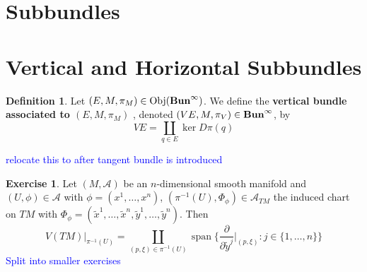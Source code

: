 \documentclass{book}
\theoremstyle{definition}
\newtheorem{defn}[definition]{Definition}
\newtheorem{ex}[definition]{Exercise}
\newcommand{\MA}{\mathcal{A}}
\DeclareMathOperator{\spn}{span}
\DeclareMathOperator{\Obj}{Obj}
\DeclareMathOperator*{\Buninf}{\text{\tbf{Bun}}^{\infty}}
\DeclareMathOperator*{\0}{\mbf{0}}
\DeclareMathOperator*{\1}{\mbf{1}}
\newcommand{\tbf}[1]{\textbf{#1}}
\newcommand{\tcb}[1]{\textcolor{blue}{#1}}
\newcommand{\p}{\partial}
\begin{document}
	
	
	
	
	
	
	
	
	
	
	
	
	
	
	
	
	
	
	
	
	
	
	
	
	
	
	
	
	
	
	
	\newpage
	\section{Subbundles}
	
	
	
	
	
	
	
	
	
	
	
	
	
	
	
	
	
	
	
	
	
	
	
	
	
	
	
	
	
	
	
	\newpage
	\section{Vertical and Horizontal Subbundles}
	
	\begin{defn}
		Let $(E, M, \pi_M) \in \Obj(\Buninf)$. We define the \tbf{vertical bundle associated to $(E, M, \pi_M)$ }, denoted $(VE, M, \pi_{V}) \in \Buninf$, by 
		$$VE = \coprod_{q \in E} \ker D\pi(q)$$
	\end{defn}

	
	\tcb{relocate this to after tangent bundle is introduced}
	\begin{ex}
		Let $(M, \MA)$ be an $n$-dimensional smooth manifold and $(U, \phi) \in \MA$ with $\phi = (x^1, \ldots, x^n)$,  $(\pi^{-1}(U), \Phi_{\phi}) \in \MA_{TM}$ the induced chart on $TM$ with $\Phi_{\phi} = (\tilde{x}^1, \ldots, \tilde{x}^n,  \tilde{y}^1, \ldots, \tilde{y}^n)$. Then 
		$$V(TM)|_{\pi^{-1}(U)} = \coprod_{(p, \xi) \in \pi^{-1}(U)} \spn \bigg \{ \frac{\p}{\p \tilde{y}^j} \bigg|_{(p, \xi)}: j \in \{1, \ldots, n\} \bigg \}$$
		\tcb{Split into smaller exercises}
	\end{ex}
\end{document}

